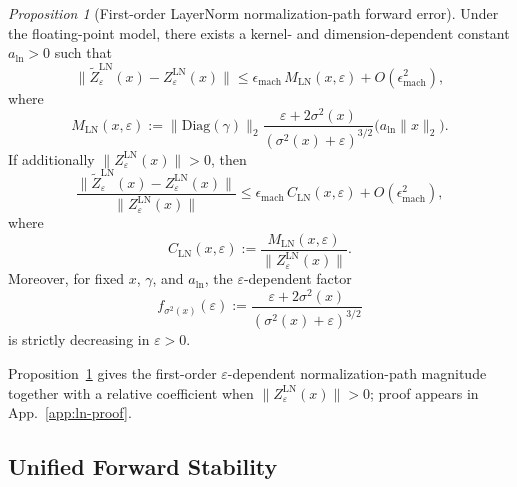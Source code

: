 \documentclass[twoside]{article}
\theoremstyle{definition}
\theoremstyle{remark}
\newtheorem{proposition}{Proposition}
\begin{document}
\begin{proposition}[First-order LayerNorm normalization-path forward error]
\label{prop:ln}
Under the floating-point model, there exists a
kernel- and dimension-dependent constant $a_{\mathrm{ln}}>0$ such that
\begin{equation}
\label{eq:ln-abs-bound}
\|\widetilde{Z}^{\mathrm{LN}}_\varepsilon(x)-Z^{\mathrm{LN}}_\varepsilon(x)\|
\le
\epsilon_{\mathrm{mach}}\,M_{\mathrm{LN}}(x,\varepsilon)
+ O(\epsilon_{\mathrm{mach}}^2),
\end{equation}
where
\begin{equation}
\label{eq:ln-abs-mag}
M_{\mathrm{LN}}(x,\varepsilon)
:=
\|\mathrm{Diag}(\gamma)\|_2
\frac{\varepsilon+2\sigma^2(x)}{(\sigma^2(x)+\varepsilon)^{3/2}}
\bigl(a_{\mathrm{ln}}\|x\|_2\bigr).
\end{equation}
If additionally $\|Z^{\mathrm{LN}}_\varepsilon(x)\|>0$, then
\begin{equation}
\label{eq:ln-bound}
\frac{\|\widetilde{Z}^{\mathrm{LN}}_\varepsilon(x)-Z^{\mathrm{LN}}_\varepsilon(x)\|}{\|Z^{\mathrm{LN}}_\varepsilon(x)\|}
\le
\epsilon_{\mathrm{mach}}\,C_{\mathrm{LN}}(x,\varepsilon)
+ O(\epsilon_{\mathrm{mach}}^2),
\end{equation}
where
\begin{equation}
\label{eq:ln-coeff}
C_{\mathrm{LN}}(x,\varepsilon)
:=
\frac{M_{\mathrm{LN}}(x,\varepsilon)}{\|Z^{\mathrm{LN}}_\varepsilon(x)\|}.
\end{equation}
Moreover, for fixed $x$, $\gamma$, and $a_{\mathrm{ln}}$, the
$\varepsilon$-dependent factor
\[
f_{\sigma^2(x)}(\varepsilon)
:=
\frac{\varepsilon+2\sigma^2(x)}{(\sigma^2(x)+\varepsilon)^{3/2}}
\]
is strictly decreasing in $\varepsilon>0$.
\end{proposition}

Proposition~\ref{prop:ln} gives the first-order $\varepsilon$-dependent
normalization-path magnitude together with a relative coefficient when
$\|Z^{\mathrm{LN}}_\varepsilon(x)\|>0$; proof appears in App.~\ref{app:ln-proof}.

\subsection{Unified Forward Stability}
\label{subsec:unified}
\end{document}
